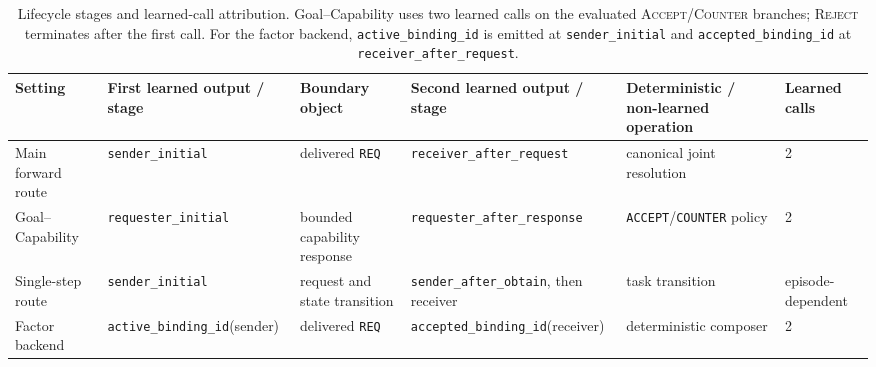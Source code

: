 \documentclass[10pt]{article}
\newcommand{\tabstyle}{\small\setlength{\tabcolsep}{2.5pt}\renewcommand{\arraystretch}{1.10}}
\newcommand{\widetabstyle}{\tabstyle}
\newcommand{\thead}[1]{\textbf{#1}}
\newcommand{\artifact}[1]{\texttt{#1}}
\begin{document}
\begin{table}[!htbp]
  \centering
  \caption{Lifecycle stages and learned-call attribution. Goal--Capability uses two learned calls on the evaluated \textsc{Accept}/\textsc{Counter} branches; \textsc{Reject} terminates after the first call. For the factor backend, \artifact{active\_binding\_id} is emitted at \artifact{sender\_initial} and \artifact{accepted\_binding\_id} at \artifact{receiver\_after\_request}.}
  \label{tab:lifecycle}
  \widetabstyle
  \begin{tabularx}{\textwidth}{L{1.90cm} L{2.40cm} Z L{2.70cm} Z C{1.50cm}}
    \toprule
    \thead{Setting} & \thead{First learned output / stage} & \thead{Boundary object} & \thead{Second learned output / stage} & \thead{Deterministic / non-learned operation} & \thead{Learned calls} \\
    \midrule
    Main forward route & \artifact{sender\_initial} & delivered \artifact{REQ} & \artifact{receiver\_}\newline\artifact{after\_request} & canonical joint resolution & 2 \\
    Goal--Capability & \artifact{requester\_}\newline\artifact{initial} & bounded capability response & \artifact{requester\_}\newline\artifact{after\_response} & \artifact{ACCEPT}/\artifact{COUNTER} policy & 2 \\
    Single-step route & \artifact{sender\_initial} & request and state transition & \artifact{sender\_after\_}\newline\artifact{obtain}, then receiver & task transition & episode-\newline dependent \\
    Factor backend & \artifact{active\_}\newline\artifact{binding\_id}\newline(sender) & delivered \artifact{REQ} & \artifact{accepted\_}\newline\artifact{binding\_id}\newline(receiver) & deterministic composer & 2 \\
    \bottomrule
  \end{tabularx}
\end{table}
\end{document}
